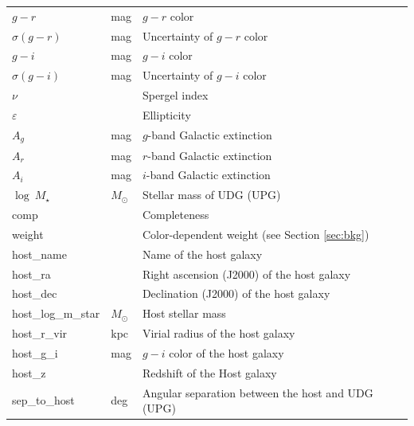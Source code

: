 \documentclass[twocolumn,astrosymb,twocolappendix]{aastex631}
\begin{document}
\begin{CJK*}{UTF8}{gbsn}
\begin{table}
\begin{center}
\begin{tabular}{l l l}
$g-r$                    & mag     & $g-r$ color                     \\
$\sigma(g-r)$            & mag     & Uncertainty of $g-r$ color      \\
$g-i$                    & mag     & $g-i$ color                     \\
$\sigma(g-i)$            & mag     & Uncertainty of $g-i$ color      \\
$\nu$                    &         & Spergel index              \\
$\varepsilon$            &         & Ellipticity                     \\
$A_g$                    & mag     & $g$-band Galactic extinction \\
$A_r$                    & mag     & $r$-band Galactic extinction \\
$A_i$                    & mag     & $i$-band Galactic extinction \\
$\log\ M_\star$ & $M_\odot$ & Stellar mass of UDG (UPG) \\
comp & & Completeness \\
weight & & Color-dependent weight (see Section \ref{sec:bkg}) \\
host\_name & & Name of the host galaxy \\
host\_ra & & Right ascension (J2000) of the host galaxy \\
host\_dec & & Declination (J2000) of the host galaxy \\
host\_log\_m\_star & $M_\odot$ & Host stellar mass\\
host\_r\_vir & kpc & Virial radius of the host galaxy \\
host\_g\_i & mag & $g-i$ color of the host galaxy \\
host\_z &  & Redshift of the Host galaxy \\
sep\_to\_host & deg & Angular separation between the host and UDG (UPG)\\
\hline\hline
\end{tabular}
\end{center}
\end{table}

\end{CJK*}
\end{document}

